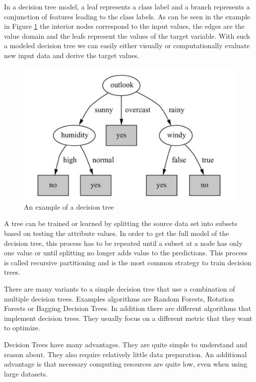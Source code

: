 In a decision tree model, a leaf represents a class label and a branch represents a conjunction of features leading to the class labels. As can be seen in the example in Figure \ref{fig:image-decision-tree} the interior nodes correspond to the input values, the edges are the value domain and the leafs represent the values of the target variable. With such a modeled decision tree we can easily either visually or computationally evaluate new input data and derive the target values.

\begin{figure}[!ht]
	\centering
		\includegraphics[width=1.0\textwidth]{images/decision-tree}
	\caption{An example of a decision tree \cite{WikipediaDecisionTrees}}
	\label{fig:image-decision-tree}
\end{figure}

A tree can be trained or learned by splitting the source data set into subsets based on testing the attribute values. In order to get the full model of the decision tree, this process has to be repeated until a subset at a node has only one value or until splitting no longer adds value to the predictions. This process is called recursive partitioning and is the most common strategy to train decision trees.

There are many variants to a simple decision tree that use a combination of multiple decision trees. Examples algorithms are Random Forests, Rotation Forests or Bagging Decision Trees. In addition there are different algorithms that implement decision trees. They usually focus on a different metric that they want to optimize. 

Decision Trees have many advantages. They are quite simple to understand and reason about. They also require relatively little data preparation. An additional advantage is that necessary computing resources are quite low, even when using large datasets.


